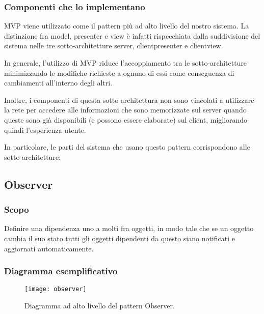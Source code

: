 \subsubsection{Componenti che lo implementano}
MVP viene utilizzato come il pattern più ad alto livello del nostro sistema. La distinzione fra model, presenter e view è infatti rispecchiata dalla suddivisione del sistema nelle tre sotto-architetture server, clientpresenter e clientview.

In generale, l'utilizzo di MVP riduce l'accoppiamento tra le sotto-architetture minimizzando le modifiche richieste a ognuno di essi come conseguenza di cambiamenti all'interno degli altri.

Inoltre, i componenti di questa sotto-architettura non sono vincolati a utilizzare la rete per accedere alle informazioni che sono memorizzate sul server quando queste sono già disponibili (e possono essere elaborate) sul client, migliorando quindi l'esperienza utente.

In particolare, le parti del sistema che usano questo pattern corrispondono alle sotto-architetture:
\begin{itemize}[noitemsep,nolistsep]
  \item server
  \item clientpresenter
  \item clientview}
\end{itemize}

\subsection{Observer}

\subsubsection{Scopo}
Definire una dipendenza uno a molti fra oggetti, in modo tale che se un oggetto cambia il suo stato tutti gli oggetti dipendenti da questo siano notificati e aggiornati automaticamente.

\subsubsection{Diagramma esemplificativo}
\begin{figure}[h]
\centering
\texttt{[image: observer]}
\caption{Diagramma ad alto livello del pattern Observer.}\label{fig:observer}
\end{figure}

